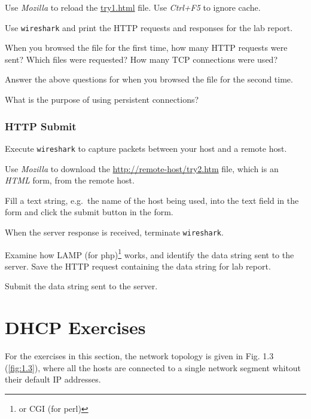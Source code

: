\documentclass{../UTNetLab}
\begin{document}
    Use \textit{Mozilla} to reload the \url{try1.html} file. Use \textit{Ctrl+F5} to ignore cache.

    Use \lstinline{wireshark} and print the HTTP requests and responses for the lab report.

    \begin{report}
        \item When you browsed the  file for the first time, how many HTTP requests were sent?
        Which files were requested?
        How many TCP connections were used?
        
        \item Answer the above questions for when you browsed the  file for the second time.
        
        \item What is the purpose of using persistent connections?
    \end{report}

\section{HTTP Submit}
    Execute \lstinline{wireshark} to capture packets between your host and a remote host. 

    Use \textit{Mozilla} to download the \url{http://remote-host/try2.htm} file, which is an \textit{HTML} form, from the remote host. 

    Fill a text string, e.g.\ the name of the host being used, into the text field in the form and click the submit button in the form. 

    When the server response is received, terminate \lstinline{wireshark}. 

    Examine how LAMP (for php)\footnote{or CGI (for perl)} works, and identify the data string sent to the server.
    Save the HTTP request containing the data string for lab report.

    \begin{report}
    \item Submit the data string sent to the server.
    \end{report}

\part{DHCP Exercises}
    For the exercises in this section, the network topology is given in Fig. 1.3 (\ref{fig:1.3}), where all the hosts are connected to a single network segment whitout their default IP addresses.
\end{document}

